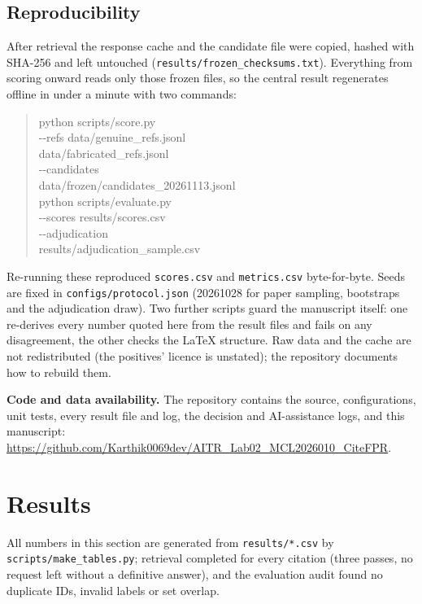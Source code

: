 \documentclass[conference]{IEEEtran}
\begin{document}
\subsection{Reproducibility}
After retrieval the response cache and the candidate file were copied, hashed with SHA-256 and left
untouched (\texttt{results/frozen\_checksums.txt}). Everything from scoring onward reads only those
frozen files, so the central result regenerates offline in under a minute with two commands:
\begin{quote}\footnotesize\ttfamily
\noindent python scripts/score.py \\
\hspace*{1.5em}-{}-refs data/genuine\_refs.jsonl \\
\hspace*{3em}data/fabricated\_refs.jsonl \\
\hspace*{1.5em}-{}-candidates \\
\hspace*{3em}data/frozen/candidates\_20261113.jsonl \\[2pt]
\noindent python scripts/evaluate.py \\
\hspace*{1.5em}-{}-scores results/scores.csv \\
\hspace*{1.5em}-{}-adjudication \\
\hspace*{3em}results/adjudication\_sample.csv
\end{quote}
Re-running these reproduced \texttt{scores.csv} and \texttt{metrics.csv} byte-for-byte. Seeds are fixed
in \texttt{configs/protocol.json} (20261028 for paper sampling, bootstraps and the adjudication draw).
Two further scripts guard the manuscript itself: one re-derives every number quoted here from the result
files and fails on any disagreement, the other checks the \LaTeX{} structure. Raw data and the cache are
not redistributed (the positives' licence is unstated); the repository documents how to rebuild them.

\textbf{Code and data availability.} The repository contains the source, configurations, unit tests,
every result file and log, the decision and AI-assistance logs, and this manuscript:
\url{https://github.com/Karthik0069dev/AITR_Lab02_MCL2026010_CiteFPR}.

\section{Results}
All numbers in this section are generated from \texttt{results/*.csv} by
\texttt{scripts/make\_tables.py}; retrieval completed for every citation (three passes, no request left
without a definitive answer), and the evaluation audit found no duplicate IDs, invalid labels or set
overlap.
\end{document}
